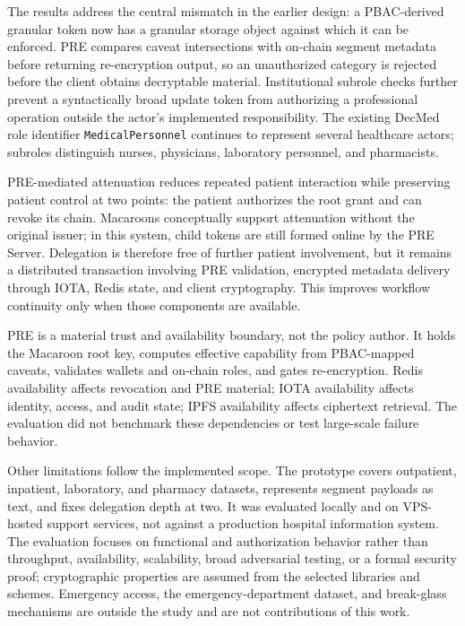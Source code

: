 \documentclass[conference,a4paper,english]{IEEEtran}
\begin{document}
The results address the central mismatch in the earlier design: a PBAC-derived granular token now has a granular storage object against which it can be enforced. PRE compares caveat intersections with on-chain segment metadata before returning re-encryption output, so an unauthorized category is rejected before the client obtains decryptable material. Institutional subrole checks further prevent a syntactically broad update token from authorizing a professional operation outside the actor's implemented responsibility. The existing DecMed role identifier \texttt{MedicalPersonnel} continues to represent several healthcare actors; subroles distinguish nurses, physicians, laboratory personnel, and pharmacists.

PRE-mediated attenuation reduces repeated patient interaction while preserving patient control at two points: the patient authorizes the root grant and can revoke its chain. Macaroons conceptually support attenuation without the original issuer; in this system, child tokens are still formed online by the PRE Server. Delegation is therefore free of further patient involvement, but it remains a distributed transaction involving PRE validation, encrypted metadata delivery through IOTA, Redis state, and client cryptography. This improves workflow continuity only when those components are available.

PRE is a material trust and availability boundary, not the policy author. It holds the Macaroon root key, computes effective capability from PBAC-mapped caveats, validates wallets and on-chain roles, and gates re-encryption. Redis availability affects revocation and PRE material; IOTA availability affects identity, access, and audit state; IPFS availability affects ciphertext retrieval. The evaluation did not benchmark these dependencies or test large-scale failure behavior.

Other limitations follow the implemented scope. The prototype covers outpatient, inpatient, laboratory, and pharmacy datasets, represents segment payloads as text, and fixes delegation depth at two. It was evaluated locally and on VPS-hosted support services, not against a production hospital information system. The evaluation focuses on functional and authorization behavior rather than throughput, availability, scalability, broad adversarial testing, or a formal security proof; cryptographic properties are assumed from the selected libraries and schemes. Emergency access, the emergency-department dataset, and break-glass mechanisms are outside the study and are not contributions of this work.
\end{document}
